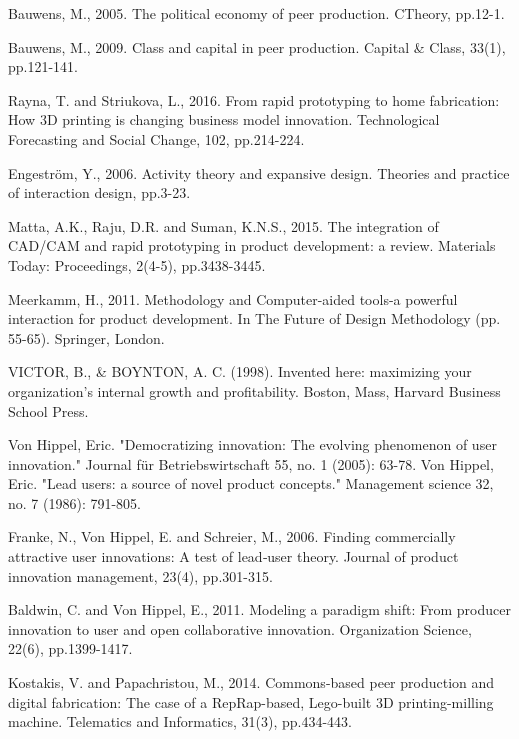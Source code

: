 Bauwens, M., 2005. The political economy of peer production. CTheory, pp.12-1.

Bauwens, M., 2009. Class and capital in peer production. Capital & Class, 33(1), pp.121-141.

Rayna, T. and Striukova, L., 2016. From rapid prototyping to home fabrication: How 3D printing is changing business model innovation. Technological Forecasting and Social Change, 102, pp.214-224.

Engeström, Y., 2006. Activity theory and expansive design. Theories and practice of interaction design, pp.3-23.

Matta, A.K., Raju, D.R. and Suman, K.N.S., 2015. The integration of CAD/CAM and rapid prototyping in product development: a review. Materials Today: Proceedings, 2(4-5), pp.3438-3445.

Meerkamm, H., 2011. Methodology and Computer-aided tools-a powerful interaction for product development. In The Future of Design Methodology (pp. 55-65). Springer, London.


VICTOR, B., & BOYNTON, A. C. (1998). Invented here: maximizing your organization's internal growth and profitability. Boston, Mass, Harvard Business School Press. 

Von Hippel, Eric. "Democratizing innovation: The evolving phenomenon of user innovation." Journal für Betriebswirtschaft 55, no. 1 (2005): 63-78.
Von Hippel, Eric. "Lead users: a source of novel product concepts." Management science 32, no. 7 (1986): 791-805.

Franke, N., Von Hippel, E. and Schreier, M., 2006. Finding commercially attractive user innovations: A test of lead‐user theory. Journal of product innovation management, 23(4), pp.301-315.

Baldwin, C. and Von Hippel, E., 2011. Modeling a paradigm shift: From producer innovation to user and open collaborative innovation. Organization Science, 22(6), pp.1399-1417.


Kostakis, V. and Papachristou, M., 2014. Commons-based peer production and digital fabrication: The case of a RepRap-based, Lego-built 3D printing-milling machine. Telematics and Informatics, 31(3), pp.434-443.

